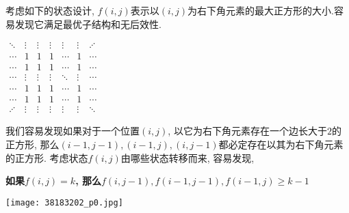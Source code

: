 考虑如下的状态设计, $f(i,j)$表示以$(i,j)$为右下角元素的最大正方形的大小.容易发现它满足最优子结构和无后效性.
\begin{center}
	\begin{math}
	\begin{matrix}
	\ddots& \vdots& \vdots& \vdots& \vdots& \vdots& \adots& \\ 
	\cdots& 1     & 1     & 1     & \cdots& 1     & \cdots& \\
	\cdots& 1     & 1     & 1     & \cdots& 1     & \cdots& \\
	\cdots& \vdots& \vdots& \vdots& \ddots& \vdots& \cdots& \\
	\cdots& 1     & 1     & 1     & \cdots& 1     & \cdots& \\
	\cdots& 1     & 1     & 1     &　\cdots& 1     & \cdots& \\ 
	\adots& \vdots& \vdots& \vdots& \vdots& \vdots& \ddots& 
	\end{matrix}
	\end{math}
\end{center}
\par 我们容易发现如果对于一个位置$(i,j)$, 以它为右下角元素存在一个边长大于$2$的正方形, 那么$(i-1,j-1),(i-1,j),(i,j-1)$都必定存在以其为右下角元素的正方形.
考虑状态$f(i,j)$由哪些状态转移而来, 容易发现, \begin{center}\textbf{如果$f(i,j)=k$, 那么$f(i,j-1),f(i-1,j-1),f(i-1,j)\geq k-1$}\end{center}

\begin{center}\texttt{[image: 38183202\_p0.jpg]}\end{center}
\note

